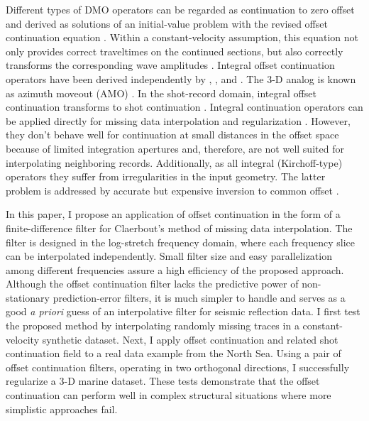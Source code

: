 Different types of DMO operators \cite[]{DMP00-00-01300130} can be
regarded as continuation to zero offset and derived as solutions of an
initial-value problem with the revised offset continuation equation
\cite[]{GEO68-02-07180732}. Within a constant-velocity assumption, this equation
not only provides correct traveltimes on the continued sections, but
also correctly transforms the corresponding wave amplitudes
\cite[]{SEG-1996-1731}. Integral offset continuation operators have
been derived independently by \cite{Chemingui.sep.82.117},
\cite{GEO61-06-18461858}, and \cite{stovas}.  The 3-D analog is known
as azimuth moveout (AMO) \cite[]{GEO63-02-05740588}. In the
shot-record domain, integral offset continuation transforms to shot
continuation \cite[]{Schwab.sep.77.117,SEG-1993-0673,SEG-1996-0439}.
Integral continuation operators can be applied directly for missing
data interpolation and regularization
\cite[]{SEG-1994-1549,SEG-1999-19951998}. However, they don't behave
well for continuation at small distances in the offset space because
of limited integration apertures and, therefore, are not well suited
for interpolating neighboring records. Additionally, as all integral
(Kirchoff-type) operators they suffer from irregularities in the input
geometry. The latter problem is addressed by accurate but expensive
inversion to common offset \cite[]{Chemingui.sepphd.101}.  \par In
this paper, I propose an application of offset continuation in the
form of a finite-difference filter for Claerbout's method of missing
data interpolation.  The filter is designed in the log-stretch
frequency domain, where each frequency slice can be interpolated
independently.  Small filter size and easy parallelization among
different frequencies assure a high efficiency of the proposed
approach. Although the offset continuation filter lacks the predictive
power of non-stationary prediction-error filters, it is much simpler
to handle and serves as a good \emph{a priori} guess of an
interpolative filter for seismic reflection data. I first test the
proposed method by interpolating randomly missing traces in a
constant-velocity synthetic dataset. Next, I apply offset continuation
and related shot continuation field to a real data example from the
North Sea. Using a pair of offset continuation filters, operating in
two orthogonal directions, I successfully regularize a 3-D marine
dataset. These tests demonstrate that the offset continuation can
perform well in complex structural situations where more simplistic
approaches fail.


